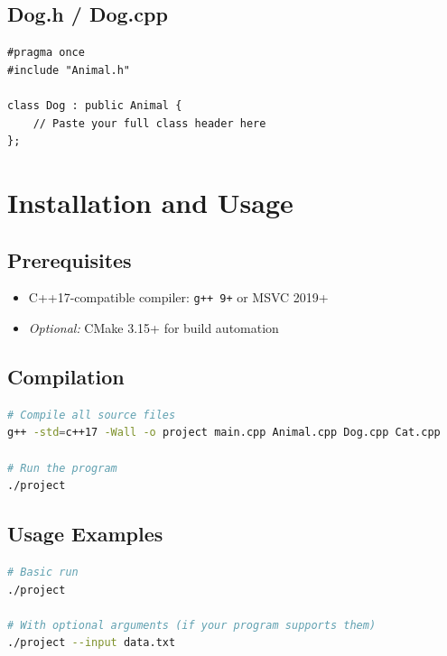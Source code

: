 \documentclass[11pt]{article}
\begin{document}
\subsection{Dog.h / Dog.cpp}
\begin{lstlisting}[caption={Dog.h --- derived class header}]
#pragma once
#include "Animal.h"

class Dog : public Animal {
    // Paste your full class header here
};
\end{lstlisting}

\section{Installation and Usage}
\label{sec:install}

\subsection{Prerequisites}
\begin{itemize}
    \item C++17-compatible compiler: \texttt{g++ 9+} or MSVC 2019+
    \item \textit{Optional:} CMake 3.15+ for build automation
\end{itemize}

\subsection{Compilation}
\begin{lstlisting}[language=bash, caption={Building with g++}]
# Compile all source files
g++ -std=c++17 -Wall -o project main.cpp Animal.cpp Dog.cpp Cat.cpp

# Run the program
./project
\end{lstlisting}

\subsection{Usage Examples}
\begin{lstlisting}[language=bash, caption={Running the program}]
# Basic run
./project

# With optional arguments (if your program supports them)
./project --input data.txt
\end{lstlisting}
\end{document}
